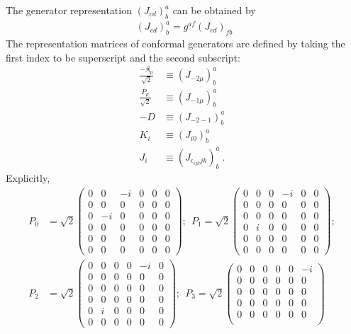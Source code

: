 \documentclass[aps,reprint,notitlepage,nofootinbib,superscriptaddress]{revtex4-1}
\begin{document}
The generator representation $(J_{cd})^a_b$ can be obtained by
\begin{align}
    (J_{cd})^a_b=g^{af}(J_{cd})_{fb}
\end{align}
The representation matrices of conformal generators are defined by taking the first  index to be superscript and the second subscript:
\begin{align}
    \frac{-\mathfrak{K}_\mu}{\sqrt{2}}&\equiv (J_{-2\mu})^a_b~\\
    \frac{P_\mu}{\sqrt{2}}&\equiv (J_{-1\mu})^a_b\\
    -D&\equiv (J_{-2-1})^a_b\\
    K_i&\equiv (J_{i0})^a_b\\
    J_i&\equiv (J_{\epsilon_{ijk}jk})^a_b~.~~
\end{align}
Explicitly,
\begin{align*}
    P_0&=\sqrt{2}\begin{pmatrix}
    0&0&-i&0&0&0\\
    0&0&0&0&0&0\\
    0&-i&0&0&0&0\\
    0&0&0&0&0&0\\
    0&0&0&0&0&0\\
    0&0&0&0&0&0
    \end{pmatrix};~~P_1=\sqrt{2}\begin{pmatrix}
    0&0&0&-i&0&0\\
    0&0&0&0&0&0\\
    0&0&0&0&0&0\\
    0&i&0&0&0&0\\
    0&0&0&0&0&0\\
    0&0&0&0&0&0
    \end{pmatrix};~~\\
    P_2&=\sqrt{2}\begin{pmatrix}
    0&0&0&0&-i&0\\
    0&0&0&0&0&0\\
    0&0&0&0&0&0\\
    0&0&0&0&0&0\\
    0&i&0&0&0&0\\
    0&0&0&0&0&0
    \end{pmatrix};~~P_3=\sqrt{2}\begin{pmatrix}
    0&0&0&0&0&-i\\
    0&0&0&0&0&0\\
    0&0&0&0&0&0\\
    0&0&0&0&0&0\\
    0&0&0&0&0&0\\

\end{pmatrix}
\end{align*}
\end{document}
